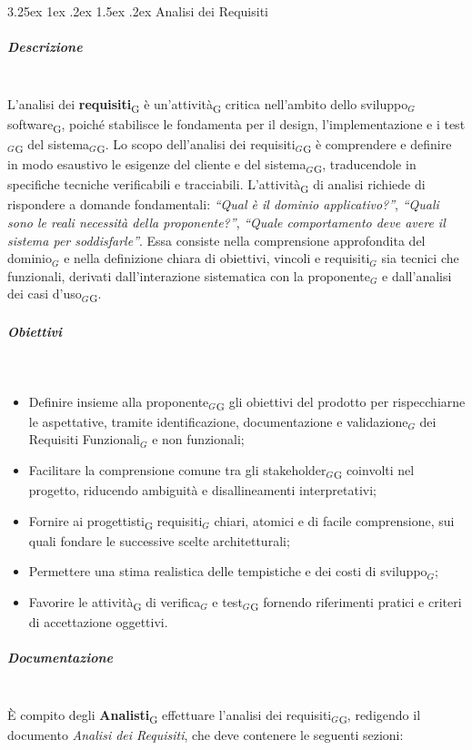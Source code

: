 \documentclass[a4paper, 10pt]{article}
\makeatletter
\renewcommand\paragraph{\@startsection{paragraph}{4}{\z@}%
  {3.25ex \@plus1ex \@minus .2ex}%
  {1.5ex \@plus .2ex}%
  {\normalfont\normalsize\bfseries}}
\makeatother
\begin{document}
\paragraph{Analisi dei Requisiti}
\subparagraph{Descrizione}~\\
L'analisi dei \textbf{requisiti}\textsubscript{G} è un'attività\textsubscript{G} critica nell'ambito dello sviluppo$_G$ software\textsubscript{G}, poiché stabilisce le fondamenta per il design, l'implementazione e i test$_G$\textsubscript{G} del sistema$_G$\textsubscript{G}. Lo scopo dell'analisi dei requisiti$_G$\textsubscript{G} è comprendere e definire in modo esaustivo le esigenze del cliente e del sistema$_G$\textsubscript{G}, traducendole in specifiche tecniche verificabili e tracciabili.
L'attività\textsubscript{G} di analisi richiede di rispondere a domande fondamentali: \textit{``Qual è il dominio applicativo?''}, \textit{``Quali sono le reali necessità della proponente?''}, \textit{``Quale comportamento deve avere il sistema per soddisfarle''}. Essa consiste nella comprensione approfondita del dominio$_G$ e nella definizione chiara di obiettivi, vincoli e requisiti$_G$ sia tecnici che funzionali, derivati dall'interazione sistematica con la proponente$_G$ e dall'analisi dei casi d'uso$_G$\textsubscript{G}.
\subparagraph{Obiettivi}~\\
\begin{itemize}
    \item Definire insieme alla proponente$_G$\textsubscript{G} gli obiettivi del prodotto per rispecchiarne le aspettative, tramite identificazione, documentazione e validazione$_G$ dei Requisiti Funzionali$_G$ e non funzionali;
    \item Facilitare la comprensione comune tra gli stakeholder$_G$\textsubscript{G} coinvolti nel progetto, riducendo ambiguità e disallineamenti interpretativi;
    \item Fornire ai progettisti\textsubscript{G} requisiti$_G$ chiari, atomici e di facile comprensione, sui quali fondare le successive scelte architetturali;
    \item Permettere una stima realistica delle tempistiche e dei costi di sviluppo$_G$;
    \item Favorire le attività\textsubscript{G} di verifica$_G$ e test$_G$\textsubscript{G} fornendo riferimenti pratici e criteri di accettazione oggettivi.
\end{itemize}
\subparagraph{Documentazione}~\\
È compito degli \textbf{Analisti}\textsubscript{G} effettuare l'analisi dei requisiti$_G$\textsubscript{G}, redigendo il documento \textit{Analisi dei Requisiti}, che deve contenere le seguenti sezioni:
\end{document}
